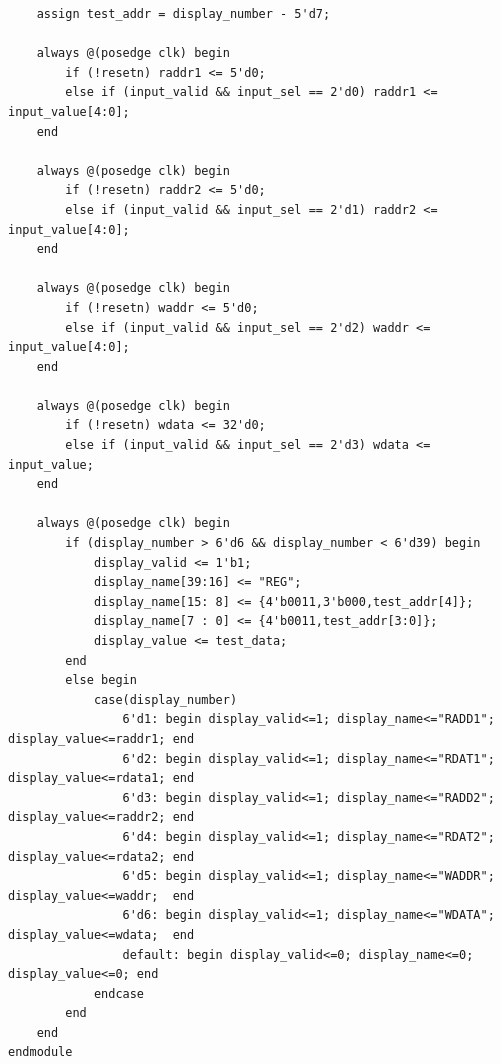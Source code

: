 \documentclass[12pt,a4paper]{article}
\begin{document}
\begin{lstlisting}
    assign test_addr = display_number - 5'd7;

    always @(posedge clk) begin
        if (!resetn) raddr1 <= 5'd0;
        else if (input_valid && input_sel == 2'd0) raddr1 <= input_value[4:0];
    end

    always @(posedge clk) begin
        if (!resetn) raddr2 <= 5'd0;
        else if (input_valid && input_sel == 2'd1) raddr2 <= input_value[4:0];
    end

    always @(posedge clk) begin
        if (!resetn) waddr <= 5'd0;
        else if (input_valid && input_sel == 2'd2) waddr <= input_value[4:0];
    end

    always @(posedge clk) begin
        if (!resetn) wdata <= 32'd0;
        else if (input_valid && input_sel == 2'd3) wdata <= input_value;
    end

    always @(posedge clk) begin
        if (display_number > 6'd6 && display_number < 6'd39) begin
            display_valid <= 1'b1;
            display_name[39:16] <= "REG";
            display_name[15: 8] <= {4'b0011,3'b000,test_addr[4]};
            display_name[7 : 0] <= {4'b0011,test_addr[3:0]};
            display_value <= test_data;
        end
        else begin
            case(display_number)
                6'd1: begin display_valid<=1; display_name<="RADD1"; display_value<=raddr1; end
                6'd2: begin display_valid<=1; display_name<="RDAT1"; display_value<=rdata1; end
                6'd3: begin display_valid<=1; display_name<="RADD2"; display_value<=raddr2; end
                6'd4: begin display_valid<=1; display_name<="RDAT2"; display_value<=rdata2; end
                6'd5: begin display_valid<=1; display_name<="WADDR"; display_value<=waddr;  end
                6'd6: begin display_valid<=1; display_name<="WDATA"; display_value<=wdata;  end
                default: begin display_valid<=0; display_name<=0; display_value<=0; end
            endcase
        end
    end
endmodule
\end{lstlisting}
\end{document}
